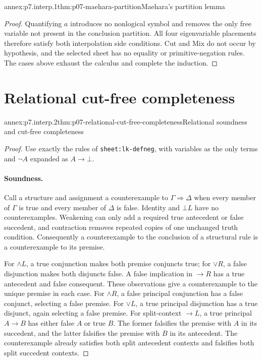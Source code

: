 \begin{annexitem}{annex:p7.interp.1}{thm:p07-maehara-partition}{Maehara's partition lemma}
\begin{proof}
Quantifying \(a\) introduces no nonlogical symbol and removes the only free
variable not present in the conclusion partition.  All four eigenvariable
placements therefore satisfy both interpolation side conditions.  Cut and Mix
do not occur by hypothesis, and the selected sheet has no equality or
primitive-negation rules.  The cases above exhaust the calculus and complete
the induction.
\end{proof}
\end{annexitem}

\section{Relational cut-free completeness}

\begin{annexitem}{annex:p7.interp.2}{thm:p07-relational-cut-free-completeness}{Relational soundness and cut-free completeness}
\begin{proof}
Use exactly the rules of \texttt{sheet:lk-defneg}, with variables as the
only terms and \(\neg A\) expanded as \(A\to\bot\).

\paragraph{Soundness.}
Call a structure and assignment a counterexample to
\(\Gamma\Rightarrow\Delta\) when every member of \(\Gamma\) is true
and every member of \(\Delta\) is false.
Identity and \(\bot L\) have no counterexamples.
Weakening can only add a required true antecedent or false succedent,
and contraction removes repeated copies of one unchanged truth condition.
Consequently a counterexample to the conclusion of a structural rule
is a counterexample to its premise.

For \(\land L\), a true conjunction makes both premise conjuncts true;
for \(\lor R\), a false disjunction makes both disjuncts false.
A false implication in \(\to R\) has a true antecedent and false
consequent.  These observations give a counterexample to the unique
premise in each case.
For \(\land R\), a false principal conjunction has a false conjunct,
selecting a false premise.  For \(\lor L\), a true principal disjunction
has a true disjunct, again selecting a false premise.
For split-context \(\to L\), a true principal \(A\to B\) has either
false \(A\) or true \(B\).  The former falsifies the premise with
\(A\) in its succedent, and the latter falsifies the premise with
\(B\) in its antecedent.  The counterexample already satisfies both
split antecedent contexts and falsifies both split succedent contexts.


\end{proof}
\end{annexitem}
